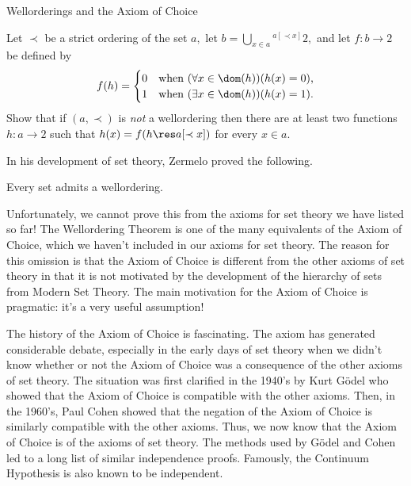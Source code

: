 \begin{unit}{Wellorderings and the Axiom of Choice}
\begin{problem}
  Let \({\prec}\) be a strict ordering of the set \(a,\) let \(b = \bigcup_{x \in a} {}^{a[{\prec x}]}2,\) and let \(f:b \to 2\) be defined by \[f(h) = \begin{cases}
    0 & \text{when $(\forall x \in \dom(h))(h(x) = 0)$,} \\
    1 & \text{when $(\exists x \in \dom(h))(h(x) = 1)$.}
  \end{cases}\]
  Show that if \((a,{\prec})\) is \emph{not} a wellordering then there are at least two functions \(h:a \to 2\) such that \(h(x) = f(h \res a[{\prec x}])\) for every \(x \in a.\) 
\end{problem}

In his development of set theory, Zermelo proved the following.

\begin{theorem}\label{T:Wellordering}
  Every set admits a wellordering.
\end{theorem}

\noindent
Unfortunately, we cannot prove this from the axioms for set theory we have listed so far!
The Wellordering Theorem is one of the many equivalents of the Axiom of Choice, which we haven't included in our axioms for set theory.
The reason for this omission is that the Axiom of Choice is different from the other axioms of set theory in that it is not motivated by the development of the hierarchy of sets from Modern Set Theory.
The main motivation for the Axiom of Choice is pragmatic: it's a very useful assumption!

The history of the Axiom of Choice is fascinating.
The axiom has generated considerable debate, especially in the early days of set theory when we didn't know whether or not the Axiom of Choice was a consequence of the other axioms of set theory.
The situation was first clarified in the 1940's by Kurt G{\"o}del who showed that the Axiom of Choice is compatible with the other axioms.
Then, in the 1960's, Paul Cohen showed that the negation of the Axiom of Choice is similarly compatible with the other axioms.
Thus, we now know that the Axiom of Choice is  of the axioms of set theory.
The methods used by G{\"o}del and Cohen led to a long list of similar independence proofs.
Famously, the Continuum Hypothesis is also known to be independent.


\end{unit}

